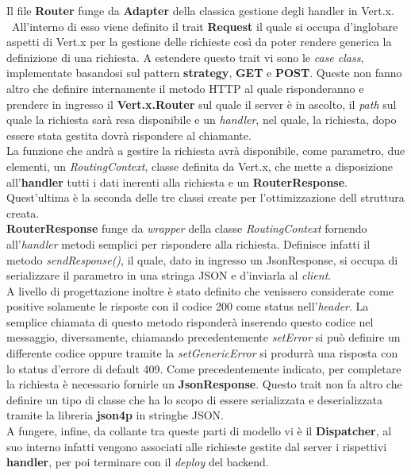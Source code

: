 	  Il file \textbf{Router} funge da \textbf{Adapter} della classica gestione degli handler in Vert.x.\\\
	  All'interno di esso viene definito il trait \textbf{Request} il quale si occupa d'inglobare aspetti di Vert.x per la gestione delle richieste così da poter rendere generica la definizione di una richiesta.
	  A estendere questo trait vi sono le \textit{case class}, implementate basandosi sul pattern \textbf{strategy}, \textbf{GET} e \textbf{POST}. Queste non fanno altro che definire internamente il metodo HTTP al quale risponderanno e prendere in ingresso il \textbf{Vert.x.Router} sul quale il server è in ascolto, il \textit{path} sul quale la richiesta sarà resa disponibile e un \textit{handler}, nel quale, la richiesta, dopo essere stata gestita dovrà rispondere al chiamante. \\
	  La funzione che andrà a gestire la richiesta avrà disponibile, come parametro, due elementi, un \textit{RoutingContext}, classe definita da Vert.x, che mette a disposizione all'\textbf{handler} tutti i dati inerenti alla richiesta e un \textbf{RouterResponse}.
	  Quest'ultima è la seconda delle tre classi create per l'ottimizzazione dell struttura creata. 
	  \\
	  \textbf{RouterResponse} funge da \textit{wrapper} della classe \textit{RoutingContext} fornendo all'\textit{handler} metodi semplici per rispondere alla richiesta. Definisce infatti il metodo \textit{sendResponse()}, il quale, dato in ingresso un JsonResponse, si occupa di serializzare il parametro in una stringa JSON e d'inviarla al \textit{client}. 
	  \\
	  A livello di progettazione inoltre è stato definito che venissero considerate come positive solamente le risposte con il codice 200 come status nell'\textit{header}. La semplice chiamata di questo metodo risponderà inserendo questo codice nel messaggio, diversamente, chiamando precedentemente \textit{setError} si può definire un differente codice oppure tramite la \textit{setGenericError} si produrrà una risposta con lo status d'errore di default 409.
	  Come precedentemente indicato, per completare la richiesta è necessario fornirle un \textbf{JsonResponse}. Questo trait non fa altro che definire un tipo di classe che ha lo scopo di essere serializzata e deserializzata tramite la libreria \textbf{json4p} in stringhe JSON. \\
	  A fungere, infine, da collante tra queste parti di modello vi è il \textbf{Dispatcher}, al suo interno infatti vengono associati alle richieste gestite dal server i rispettivi \textbf{handler}, per poi terminare con il \textit{deploy} del backend.
      
